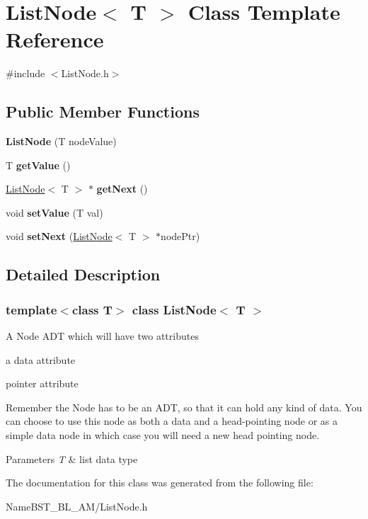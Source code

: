 \hypertarget{class_list_node}{}\section{List\+Node$<$ T $>$ Class Template Reference}
\label{class_list_node}


{\ttfamily \#include $<$List\+Node.\+h$>$}

\subsection*{Public Member Functions}
\begin{DoxyCompactItemize}
\item 
\mbox{\label{class_list_node_ab73e442b9e5e6fdd55fd14c7a286e703}} 
{\bfseries List\+Node} (T node\+Value)
\item 
\mbox{\label{class_list_node_a6293083df78a7583341575992a5c035c}} 
T {\bfseries get\+Value} ()
\item 
\mbox{\label{class_list_node_a99319bff828dc3dd174372b6aca86d3f}} 
\hyperlink{class_list_node}{List\+Node}$<$ T $>$ $\ast$ {\bfseries get\+Next} ()
\item 
\mbox{\label{class_list_node_a05c549b3db51cfbcf98f8f0edf5fe45c}} 
void {\bfseries set\+Value} (T val)
\item 
\mbox{\label{class_list_node_a56058261c0a852e3d6291e43aaf15bd4}} 
void {\bfseries set\+Next} (\hyperlink{class_list_node}{List\+Node}$<$ T $>$ $\ast$node\+Ptr)
\end{DoxyCompactItemize}


\subsection{Detailed Description}
\subsubsection*{template$<$class T$>$\newline
class List\+Node$<$ T $>$}

A Node A\+DT which will have two attributes
\begin{DoxyItemize}
\item a data attribute
\item pointer attribute
\end{DoxyItemize}Remember the Node has to be an A\+DT, so that it can hold any kind of data. You can choose to use this node as both a data and a head-\/pointing node or as a simple data node in which case you will need a new head pointing node. 
\begin{DoxyParams}{Parameters}
{\em T} & list data type \\
\hline
\end{DoxyParams}


The documentation for this class was generated from the following file\+:\begin{DoxyCompactItemize}
\item 
Name\+B\+S\+T\+\_\+\+B\+L\+\_\+\+A\+M/List\+Node.\+h\end{DoxyCompactItemize}

